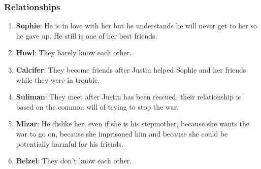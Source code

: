 




\subsubsection*{Relationships}
\begin{enumerate}
\item \textbf{Sophie}: He is in love with her but he understands he will never get to her so he gave up. He still is one of her best friends.
\item \textbf{Howl}: They barely know each other.
\item \textbf{Calcifer}: They become friends after Justin helped Sophie and her friends while they were in trouble.
\item \textbf{Suliman}: They meet after Justin has been rescued, their relationship is based on the common will of trying to stop the war.
\item \textbf{Mizar}: He dislike her, even if she is his stepmother, because she wants the war to go on, because she imprisoned him and because she could be potentially harmful for his friends.
\item \textbf{Belzel}: They don't know each other.
\end{enumerate}

